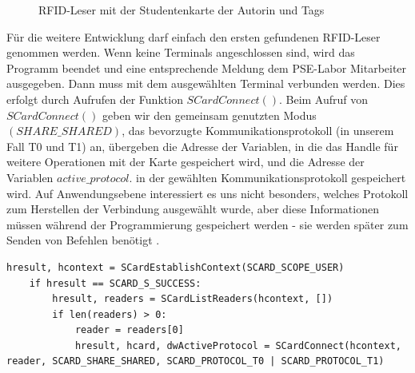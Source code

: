 \begin{figure}
	\caption{RFID-Leser mit der Studentenkarte der Autorin und Tags}
	\label{fig:baga_stud}
\end{figure} 
Für die weitere Entwicklung darf einfach den ersten gefundenen RFID-Leser genommen werden. Wenn keine Terminals angeschlossen sind, wird das Programm beendet und eine entsprechende Meldung dem PSE-Labor Mitarbeiter ausgegeben. Dann muss mit dem ausgewählten Terminal verbunden werden. Dies erfolgt durch Aufrufen der Funktion $SCardConnect()$. Beim Aufruf von $SCardConnect()$ geben wir den gemeinsam genutzten Modus $(SHARE\_SHARED)$, das bevorzugte Kommunikationsprotokoll (in unserem Fall T0 und T1) an, übergeben die Adresse der Variablen, in die das Handle für weitere Operationen mit der Karte gespeichert wird, und die Adresse der Variablen $active\_protocol$. in der gewählten Kommunikationsprotokoll gespeichert wird. Auf Anwendungsebene interessiert es uns nicht besonders, welches Protokoll zum Herstellen der Verbindung ausgewählt wurde, aber diese Informationen müssen während der Programmierung gespeichert werden - sie werden später zum Senden von Befehlen benötigt \cite[p. 104]{chirico:smart_card}.
\begin{lstlisting}[caption={Funktion SCardEstablishContext},captionpos=b]
hresult, hcontext = SCardEstablishContext(SCARD_SCOPE_USER)
	if hresult == SCARD_S_SUCCESS:
		hresult, readers = SCardListReaders(hcontext, [])
		if len(readers) > 0:
			reader = readers[0]
			hresult, hcard, dwActiveProtocol = SCardConnect(hcontext, reader, SCARD_SHARE_SHARED, SCARD_PROTOCOL_T0 | SCARD_PROTOCOL_T1)
\end{lstlisting}

